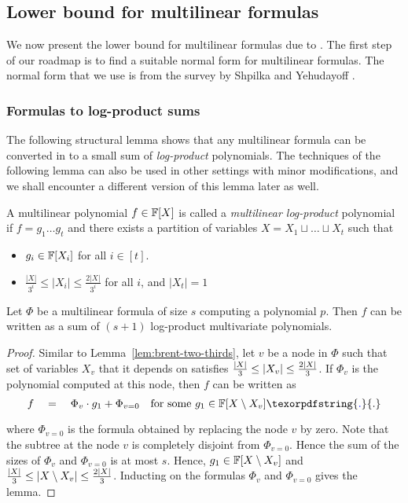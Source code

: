 \documentclass{birkjour}
\newcommand{\spaced}[1]{\quad#1\quad}
\providecommand{\DIFaddtex}[1]{{\protect\color{blue}\uwave{#1}}} %
\providecommand{\DIFaddbegin}{} %
\providecommand{\DIFaddend}{} %
\providecommand{\DIFadd}[1]{\texorpdfstring{\DIFaddtex{#1}}{#1}} %
\begin{document}
\subsection{Lower bound for multilinear formulas}
	We now present the lower bound for multilinear formulas due 
	to \cite{raz2004}. The first step of our roadmap is to find 
	a suitable normal form for multilinear formulas. The normal 
	form that we use is from the survey by Shpilka and 
	Yehudayoff \cite{sy}. 	

\subsubsection{Formulas to log-product sums}

The following structural lemma shows that any multilinear formula can be converted in to a small sum of \emph{log-product} polynomials. The techniques of the following lemma can also be used in other settings with minor modifications, and we shall encounter a different version of this lemma later as well.

\begin{definition}\label{defn:mult-logproduct}
  A multilinear polynomial $f\in \mathbb{F}[X]$ is called a \emph{multilinear log-product} polynomial if $f = g_1\dots g_t$ and there exists a partition of variables $X = X_1 \sqcup \dots \sqcup X_t$ such that
  \begin{itemize}
  \item $g_i \in \mathbb{F}[X_i]$ for all $i \in [t]$.
  \item $\frac{|X|}{3^i} \leq |X_i| \leq \frac{2|X|}{3^i}$ for all
    $i$, and $|X_t| = 1$
  \end{itemize}
\end{definition}

\begin{lemma}\label{lem:mult-logproduct}
  Let $\Phi$ be a multilinear formula of size $s$ computing a polynomial $p$. Then $f$ can be written as a sum of $(s+1)$ log-product multivariate polynomials.
\end{lemma}
\begin{proof}
  Similar to Lemma~\ref{lem:brent-two-thirds}, let $v$ be a node in $\Phi$ such that set of variables $X_v$ that it depends on satisfies $\frac{|X|}{3} \leq \left|X_v\right| \leq \frac{2|X|}{3}$. If $\Phi_v$ is the polynomial computed at this node, then $f$ can be written as
  $$
  f \spaced{=} \Phi_v \cdot g_1 + \Phi_{v=0} \quad\text{for some $g_1 \in \F[X\setminus X_v]$}\DIFaddbegin \DIFadd{.
  }\DIFaddend $$
  where $\Phi_{v=0}$ is the formula obtained by replacing the node $v$ by zero. Note that the subtree at the node $v$ is completely disjoint from $\Phi_{v=0}$. Hence the sum of the sizes of $\Phi_v$ and $\Phi_{v=0}$ is at most $s$. Hence, $g_1 \in \mathbb{F}[X\setminus X_v]$ and $\frac{|X|}{3} \leq \left|X \setminus X_v\right| \leq \frac{2|X|}{3}$. Inducting on the formulas $\Phi_v$ and $\Phi_{v=0}$ gives the lemma.
\end{proof}
\end{document}

